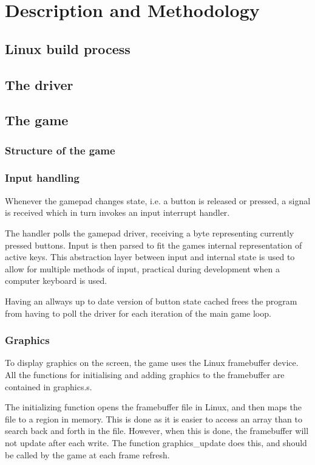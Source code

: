 \section{Description and Methodology}

\subsection{Linux build process}

\subsection{The driver}

\subsection{The game}

\subsubsection{Structure of the game}

\subsubsection{Input handling}

Whenever the gamepad changes state, i.e. a button is released or pressed,
a signal is received which in turn invokes an input interrupt handler.

The handler polls the gamepad driver, receiving a byte representing currently
pressed buttons. Input is then parsed to fit the games internal representation
of active keys. This abstraction layer between input and internal state is used
to allow for multiple methods of input, practical during development when a
computer keyboard is used.

Having an allways up to date version of button state cached frees the program
from having to poll the driver for each iteration of the main game loop.

\subsubsection{Graphics}
To display graphics on the screen, the game uses the Linux framebuffer device.
All the functions for initialising and adding graphics to the framebuffer are contained in graphics.s.

The initializing function opens the framebuffer file in Linux, and then maps the file to a region in memory.
This is done as it is easier to access an array than to search back and forth in the file.
However, when this is done, the framebuffer will not update after each write.
The function graphics_update does this, and should be called by the game at each frame refresh.


